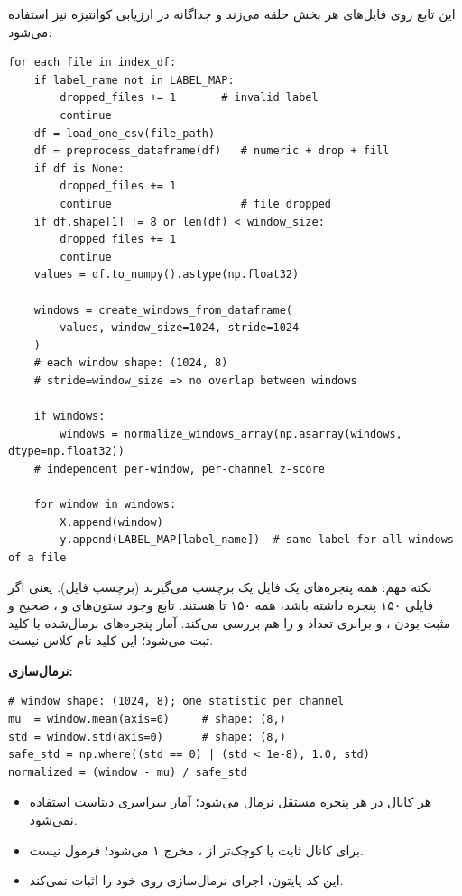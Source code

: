 \documentclass{article}
\newcommand{\mysubsection}[1]{
\par\vspace{0.5cm}
\noindent\textcolor{main_blue}{\large\textbf{#1}}
\par\vspace{0.2cm}
}
\begin{document}
این تابع روی فایل‌های هر بخش حلقه می‌زند و جداگانه در ارزیابی کوانتیزه نیز استفاده می‌شود:

\begin{latin}
\begin{lstlisting}
for each file in index_df:
    if label_name not in LABEL_MAP:
        dropped_files += 1       # invalid label
        continue
    df = load_one_csv(file_path)
    df = preprocess_dataframe(df)   # numeric + drop + fill
    if df is None:
        dropped_files += 1
        continue                    # file dropped
    if df.shape[1] != 8 or len(df) < window_size:
        dropped_files += 1
        continue
    values = df.to_numpy().astype(np.float32)

    windows = create_windows_from_dataframe(
        values, window_size=1024, stride=1024
    )
    # each window shape: (1024, 8)
    # stride=window_size => no overlap between windows

    if windows:
        windows = normalize_windows_array(np.asarray(windows, dtype=np.float32))
    # independent per-window, per-channel z-score

    for window in windows:
        X.append(window)
        y.append(LABEL_MAP[label_name])  # same label for all windows of a file
\end{lstlisting}
\end{latin}

نکته مهم: همه پنجره‌های یک فایل یک برچسب می‌گیرند (برچسب فایل).
یعنی اگر فایلی ۱۵۰ پنجره داشته باشد، همه ۱۵۰ تا  هستند.
تابع وجود ستون‌های  و ، صحیح و مثبت بودن ،
و برابری تعداد  و  را هم بررسی می‌کند. آمار پنجره‌های نرمال‌شده با
کلید  ثبت می‌شود؛ این کلید نام کلاس  نیست.

\mysubsection{نرمال‌سازی: }

\begin{latin}
\begin{lstlisting}
# window shape: (1024, 8); one statistic per channel
mu  = window.mean(axis=0)     # shape: (8,)
std = window.std(axis=0)      # shape: (8,)
safe_std = np.where((std == 0) | (std < 1e-8), 1.0, std)
normalized = (window - mu) / safe_std
\end{lstlisting}
\end{latin}

\begin{itemize}
\item هر کانال در هر پنجره مستقل نرمال می‌شود؛ آمار سراسری دیتاست استفاده نمی‌شود.
\item برای کانال ثابت یا  کوچک‌تر از ، مخرج ۱ می‌شود؛ فرمول  نیست.
\item این کد پایتون، اجرای نرمال‌سازی روی خود  را اثبات نمی‌کند.
\end{itemize}
\end{document}
